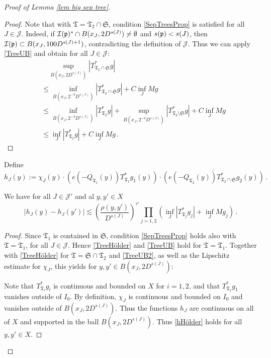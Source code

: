 \begin{proof}[Proof of Lemma \ref{lem big sep tree}]
    \begin{proof}
        Note that with $\mathfrak{T} = \mathfrak{T}_2 \cap \mathfrak{S}$, condition \eqref{SepTreesProp} is satisfied for all $J \in \mathcal{J}$. Indeed, if $\mathcal{I}(\mathfrak p)^* \cap B(x_J, 2D^{s(J)}) \neq \emptyset $ and $s(\mathfrak p) < s(J)$, then $\mathcal{I}(\mathfrak p) \subset B(x_J, 100 D^{s(J) + 1})$, contradicting the definition of $\mathcal{J}$. Thus we can apply \eqref{TreeUB} and obtain for all $J \in \mathcal{J}$:
        \begin{align}
            &\quad\sup_{B(x_J, 2 D^{s(J)})} |T^*_{\mathfrak{T}_2 \cap \mathfrak{S}} g|\nonumber \\
            &\leq \inf_{B(x_J, 2^{-3} D^{s(J)})} |T_{\mathfrak{T}_2 \cap \mathfrak{S}}^* g| + C \inf_{J} Mg\nonumber\\
            &\leq \inf_{B(x_J, 2^{-3}D^{s(J)})} |T^*_{\mathfrak{T}_2} g| + \sup_{B(x_J, 2^{-3}  D^{s(J)})}|T^*_{\mathfrak{T}_2\setminus \mathfrak{S}} g| + C \inf_{J} Mg\nonumber\\
            &\leq \inf_{J} |T^*_{\mathfrak{T}_2} g| + C \inf_{J} Mg\,.\label{TreeUB2}
        \end{align}
    \end{proof}

    Define
    \[
        h_J(y) := \chi_J(y)\cdot(e(-Q_{\mathfrak{T}_1}(y)) T_{\mathfrak{T}_1}^* g_1(y)) \cdot \overline{(e(-Q_{\mathfrak{T}_2}(y)) T_{\mathfrak{T}_2 \cap \mathfrak{S}}^* g_2(y))}\,.
    \]
    \begin{lemma}
        We have for all $J \in \mathcal{J}'$ and al $y, y' \in X$
        \begin{equation}
            \label{hHölder}
            |h_J(y)- h_J(y')| \lesssim  \left(\frac{\rho(y,y')}{D^{s(J)}}\right)^{\tau'} \prod_{j = 1,2} (\inf_{J} |T_{\mathfrak{T}_j}^* g_j| + \inf_J Mg_j)\,.
        \end{equation}
    \end{lemma}

    \begin{proof}
        Since $\mathfrak{T}_1$ is contained in $\mathfrak{S}$, condition \eqref{SepTreesProp} holds also with $\mathfrak{T} = \mathfrak{T}_1$, for all $J \in \mathcal{J}$. Hence \eqref{TreeHölder} and \eqref{TreeUB} hold for $\mathfrak{T} = \mathfrak{T}_1$. Together with \eqref{TreeHölder} for $\mathfrak{T} = \mathfrak{S} \cap \mathfrak{T}_2$ and \eqref{TreeUB2}, as well as the Lipschitz estimate for $\chi_J$, this yields for $y, y' \in B(x_J, 2 D^{s(J)})$:

        Note that $T_{\mathfrak{T}_i}^* g_i$ is continuous and bounded on $X$ for $i=1,2$, and that $T_{\mathfrak{T}_1}^* g_1$ vanishes outside of $I_0$. By definition, $\chi_J$ is continuous and bounded on $I_0$ and vanishes outside of $B(x_J, 2D^{s(J)})$. Thus the functions $h_J$ are continuous on all of $X$ and supported in the ball $B(x_J, 2D^{s(J)})$. Thus \eqref{hHölder} holds for all $y, y' \in X$.
    \end{proof}



\end{proof}
